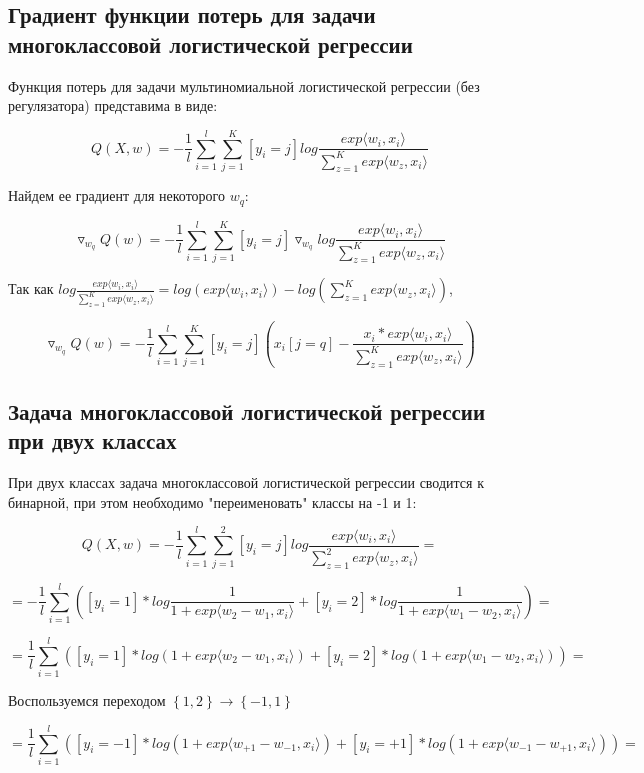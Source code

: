 \documentclass{article}
\begin{document}
\subsection{Градиент функции потерь для задачи многоклассовой логистической регрессии}

Функция потерь для задачи мультиномиальной логистической регрессии (без регулязатора) представима в виде:

$$Q(X, w) = -\frac{1}{l}\sum_{i=1}^l\sum_{j=1}^K\left[y_i=j\right]log\frac{exp\langle w_i, x_i\rangle}{\sum_{z=1}^Kexp\langle w_z, x_i\rangle}$$

Найдем ее градиент для некоторого $w_q$:

$$\triangledown_{w_q}Q(w) = - \frac{1}{l}\sum_{i=1}^l\sum_{j=1}^K\left[y_i=j\right]\triangledown_{w_q}log\frac{exp\langle w_i, x_i\rangle}{\sum_{z=1}^K exp\langle w_z, x_i\rangle}$$

Так как $log\frac{exp\langle w_i, x_i\rangle}{\sum_{z=1}^Kexp\langle w_z, x_i\rangle} = log({exp\langle w_i, x_i\rangle}) - log(\sum_{z=1}^Kexp\langle w_z, x_i\rangle)$, 

$$\triangledown_{w_q}Q(w) = - \frac{1}{l}\sum_{i=1}^l\sum_{j=1}^K \left[y_i=j \right] ( x_i\left[ j = q\right] - \frac{x_i*exp\langle w_i, x_i\rangle}{\sum_{z=1}^K exp\langle w_z, x_i\rangle})$$


\subsection{Задача многоклассовой логистической регрессии при двух классах}

При двух классах задача многоклассовой логистической регрессии сводится к бинарной, при этом необходимо "переименовать"{ } классы на -1 и 1:

$$Q(X, w) = -\frac{1}{l}\sum_{i=1}^l\sum_{j=1}^2 \left[y_i=j\right]log\frac{exp\langle w_i, x_i\rangle}{\sum_{z=1}^2 exp\langle w_z, x_i\rangle} = $$

$$= -\frac{1}{l}\sum_{i=1}^l (\left[y_i=1\right]*log\frac{1}{1+exp\langle w_2 - w_1, x_i\rangle} + \left[y_i=2\right]*log\frac{1}{1+exp\langle w_1 - w_2, x_i\rangle}) = $$

$$=\frac{1}{l}\sum_{i=1}^l (\left[y_i=1\right]*log(1+exp\langle w_2 - w_1, x_i\rangle) + \left[y_i=2\right]*log(1+exp\langle w_1 - w_2, x_i\rangle)) = $$

Воспользуемся переходом $\left\{1, 2\right\} \rightarrow \left\{-1, 1\right\} $

$$= \frac{1}{l}\sum_{i=1}^l (\left[y_i=-1\right]*log(1+exp\langle w_{+1} - w_{-1}, x_i\rangle) + \left[y_i=+1\right]*log(1+exp\langle w_{-1} - w_{+1}, x_i\rangle)) =$$
\end{document}
